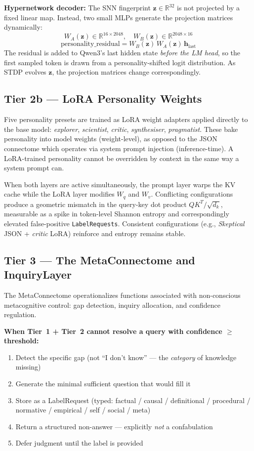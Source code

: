 \documentclass[11pt,a4paper]{article}
\begin{document}
\textbf{Hypernetwork decoder:} The SNN fingerprint $\mathbf{z} \in \mathbb{R}^{32}$ is
not projected by a fixed linear map. Instead, two small MLPs generate the projection
matrices dynamically:
\[
  W_A(\mathbf{z}) \in \mathbb{R}^{16 \times 2048}, \quad
  W_B(\mathbf{z}) \in \mathbb{R}^{2048 \times 16}
\]
\[
  \text{personality\_residual} = W_B(\mathbf{z})\, W_A(\mathbf{z})\, \mathbf{h}_{\text{last}}
\]
The residual is added to Qwen3's last hidden state \textit{before the LM head}, so the
first sampled token is drawn from a personality-shifted logit distribution. As STDP
evolves $\mathbf{z}$, the projection matrices change correspondingly.

\subsection{Tier 2b — LoRA Personality Weights}

Five personality presets are trained as LoRA weight adapters applied directly to the
base model: \textit{explorer}, \textit{scientist}, \textit{critic}, \textit{synthesiser},
\textit{pragmatist}. These bake personality into model weights (weight-level), as opposed
to the JSON connectome which operates via system prompt injection (inference-time). A
LoRA-trained personality cannot be overridden by context in the same way a system prompt
can.

When both layers are active simultaneously, the prompt layer warps the KV cache while the
LoRA layer modifies $W_q$ and $W_v$. Conflicting configurations produce a geometric
mismatch in the query-key dot product $QK^T / \sqrt{d_k}$, measurable as a spike in
token-level Shannon entropy and correspondingly elevated false-positive
\texttt{LabelRequests}. Consistent configurations (e.g., \textit{Skeptical} JSON +
\textit{critic} LoRA) reinforce and entropy remains stable.

\subsection{Tier 3 — The MetaConnectome and InquiryLayer}
\label{sec:inquiry}

The MetaConnectome operationalizes functions associated with non-conscious metacognitive
control: gap detection, inquiry allocation, and confidence regulation.

\textbf{When Tier~1 + Tier~2 cannot resolve a query with confidence $\geq$ threshold:}
\begin{enumerate}[leftmargin=*]
  \item Detect the specific gap (not ``I don't know'' — the \textit{category} of
  knowledge missing)
  \item Generate the minimal sufficient question that would fill it
  \item Store as a LabelRequest (typed: factual / causal / definitional / procedural /
  normative / empirical / self / social / meta)
  \item Return a structured non-answer — explicitly \textit{not} a confabulation
  \item Defer judgment until the label is provided
\end{enumerate}
\end{document}
